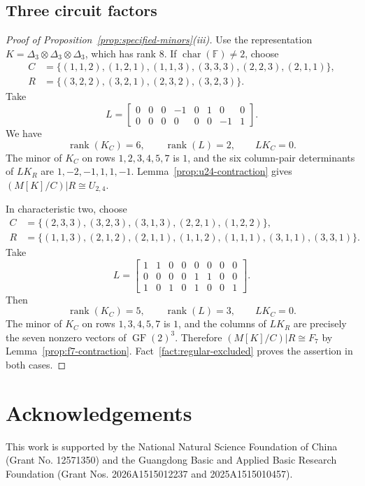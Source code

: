\documentclass[12pt,a4paper]{article}
\numberwithin{equation}{section}
\DeclareMathOperator{\rank}{rank}
\newcommand{\F}{\mathbb F}
\theoremstyle{definition}
\theoremstyle{remark}
\begin{document}
\subsection{Three circuit factors}\label{subsec:three-circuit-minor}
\begin{proof}[Proof of Proposition~\ref{prop:specified-minors}\textup{(iii)}]
Use the representation \(K=\Delta_3\otimes\Delta_3\otimes\Delta_3\),
which has rank \(8\).
If \(\operatorname{char}(\F)\ne2\), choose
\[
\begin{aligned}
 C&=\{(1,1,2),(1,2,1),(1,1,3),(3,3,3),(2,2,3),(2,1,1)\},\\
 R&=\{(3,2,2),(3,2,1),(2,3,2),(3,2,3)\}.
\end{aligned}
\]
Take
\[
 L=\begin{bmatrix}
0&0&0&-1&0&1&0&0\\
0&0&0&0&0&0&-1&1
\end{bmatrix}.
\]
We have
\[
 \rank(K_C)=6,\qquad \rank(L)=2,\qquad LK_C=0.
\]
The minor of \(K_C\) on rows \(1,2,3,4,5,7\) is \(1\), and the
six column-pair determinants of \(LK_R\) are \(1,-2,-1,1,1,-1\).
Lemma~\ref{prop:u24-contraction} gives
\((M[K]/C)|R\cong U_{2,4}\).

In characteristic two, choose
\[
\begin{aligned}
 C&=\{(2,3,3),(3,2,3),(3,1,3),(2,2,1),(1,2,2)\},\\
 R&=\{(1,1,3),(2,1,2),(2,1,1),(1,1,2),(1,1,1),(3,1,1),(3,3,1)\}.
\end{aligned}
\]
Take
\[
 L=\begin{bmatrix}
1&1&0&0&0&0&0&0\\
0&0&0&0&1&1&0&0\\
1&0&1&0&1&0&0&1
\end{bmatrix}.
\]
Then
\[
 \rank(K_C)=5,\qquad \rank(L)=3,\qquad LK_C=0.
\]
The minor of \(K_C\) on rows \(1,3,4,5,7\) is \(1\), and the
columns of \(LK_R\) are precisely the seven nonzero vectors of
\(\operatorname{GF}(2)^3\).  Therefore
\((M[K]/C)|R\cong F_7\) by Lemma~\ref{prop:f7-contraction}.
Fact~\ref{fact:regular-excluded} proves the assertion in both cases.
\end{proof}

\section*{Acknowledgements}
This work is supported by the National Natural Science Foundation of China (Grant No. 12571350) and the Guangdong Basic and Applied Basic Research Foundation (Grant Nos. 2026A1515012237 and 2025A1515010457). 
\end{document}
